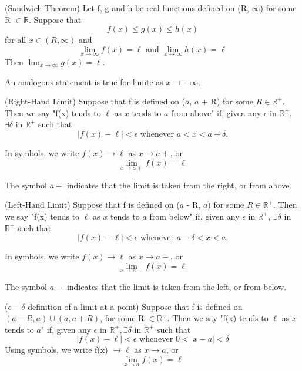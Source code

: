 \documentclass[12pt]{article}
\begin{document}
			\begin{thm}
				(Sandwich Theorem) Let f, g and h be real functions defined on (R, $\infty$) for some R $\in 						\mathbb{R}$. Suppose that
						\[
							f(x) \leq g(x) \leq h(x)
						\]
				for all $x \in (R, \infty)$ and
						\[
							\lim_{x \to \infty}{f(x)} = \ell \mbox{    and    } \lim_{x \to \infty}{h(x)} = \ell
						\]
				Then $\lim_{x \to \infty}{g(x)} = \ell$.

				An analogous statement is true for limite as $x \to -\infty$.
			\end{thm}

			\begin{defn}
				(Right-Hand Limit) Suppose that f is defined on ($a$, $a$ + R) for some $R \in \mathbb{R}^+$. 							Then we say "f(x) tends to $\ell$ as $x$ tends to $a$ from above" if, given any $\epsilon$ in 					$\mathbb{R}^+$, $\exists \delta$ in $\mathbb{R}^+$ such that
					\[
						|f(x) - \ell| < \epsilon \mbox {    whenever    } a < x < a + \delta.
					\]

				In symbols, we write $f(x) \to \ell$ as $x \to a+$, or
					\[
						\lim_{x \to a+}{f(x)} = \ell
					\]

				The symbol $a+$ indicates that the limit is taken from the right, or from above.
			\end{defn} 

			\begin{defn}
				(Left-Hand Limit) Suppose that f is defined on ($a$ - R, $a$) for some $R \in \mathbb{R}^+$. Then 					we say "f(x) tends to $\ell$ as $x$ tends to $a$ from below" if, given any $\epsilon$ in 							$\mathbb{R}^+$, $\exists \delta$ in $\mathbb{R}^+$ such that
					\[
						|f(x) - \ell| < \epsilon \mbox {    whenever    } a - \delta < x < a.
					\]

				In symbols, we write $f(x) \to \ell$ as $x \to a-$, or
					\[
						\lim_{x \to a-}{f(x)} = \ell
					\]

				The symbol $a-$ indicates that the limit is taken from the left, or from below.
			\end{defn}

			\begin{defn}
				($\epsilon-\delta$ definition of a limit at a point) Suppose that f is defined on $(a - R, a) \cup (a, a + 					R)$, for some R $\in \mathbb{R}^+$. Then we say "f(x) tends to $\ell$ as $x$ tends to 							$a$" if, given any $\epsilon$ in $\mathbb{R}^+, \exists \delta$ in $\mathbb{R}^+$ such 						that
					\[
						|f(x) - \ell| < \epsilon \mbox{    whenever    } 0 < |x - a| < \delta
					\]
				Using symbols, we write f(x) $\to \ell$ as $x \to a$, or
					\[
						\lim_{x \to a}{f(x)} = \ell
					\]
			\end{defn}
\end{document}
